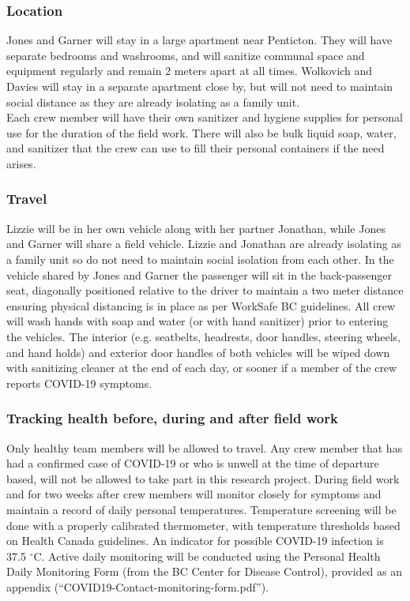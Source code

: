 \documentclass[11pt,letter]{article}
\begin{document}
\subsubsection{Location}
Jones and Garner will stay in a large apartment near Penticton. They will have separate bedrooms and washrooms, and will sanitize communal space and equipment regularly and remain 2 meters apart at all times. Wolkovich and Davies will stay in a separate apartment close by, but will not need to maintain social distance as they are already isolating as a family unit. \\

Each crew member will have their own sanitizer and hygiene supplies for personal use for the duration of the field work. There will also be bulk liquid soap, water, and sanitizer that the crew can use to fill their personal containers if the need arises.

\subsubsection {Travel}
Lizzie will be in her own vehicle along with her partner Jonathan, while Jones and Garner will share a field vehicle. Lizzie and Jonathan are already isolating as a family unit so do not need to maintain social isolation from each other. In the vehicle shared by Jones and Garner the passenger will sit in the back-passenger seat, diagonally positioned relative to the driver to maintain a two meter distance ensuring physical distancing is in place as per WorkSafe BC guidelines. All crew will wash hands with soap and water (or with hand sanitizer) prior to entering the vehicles. The interior (e.g. seatbelts, headrests, door handles, steering wheels, and hand holds) and exterior door handles of both vehicles will be wiped down with sanitizing cleaner at the end of each day, or sooner if a member of the crew reports COVID-19 symptoms.

\subsubsection {Tracking health before, during and after field work}
Only healthy team members will be allowed to travel. Any crew member that has had a confirmed case of COVID-19 or who is unwell at the time of departure based, will not be allowed to take part in this research project. During field work and for two weeks after crew members will monitor closely for symptoms and maintain a record of daily personal temperatures. Temperature screening will be done with a properly calibrated thermometer, with temperature thresholds based on Health Canada guidelines. An indicator for possible COVID-19 infection is 37.5 $^{\circ}$C. Active daily monitoring will be conducted using the Personal Health Daily Monitoring Form (from the BC Center for Disease Control), provided as an appendix (``COVID19-Contact-monitoring-form.pdf'').
\end{document}
